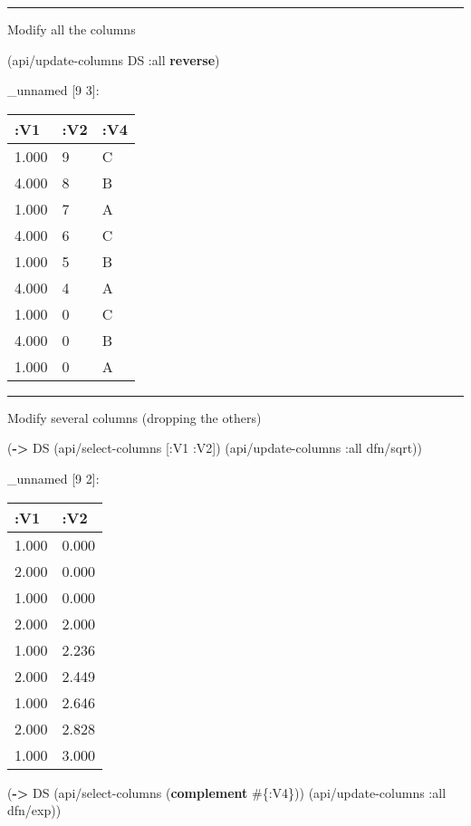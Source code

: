 \documentclass[]{article}
\newenvironment{Shaded}{\begin{snugshade}}{\end{snugshade}}
\newcommand{\KeywordTok}[1]{\textcolor[rgb]{0.13,0.29,0.53}{\textbf{#1}}}
\newcommand{\AttributeTok}[1]{\textcolor[rgb]{0.77,0.63,0.00}{#1}}
\newcommand{\NormalTok}[1]{#1}
\begin{document}
\begin{center}\rule{0.5\linewidth}{0.5pt}\end{center}

Modify all the columns

\begin{Shaded}
\begin{Highlighting}[]
\NormalTok{(api/update-columns DS }\AttributeTok{:all} \KeywordTok{reverse}\NormalTok{)}
\end{Highlighting}
\end{Shaded}

\_unnamed {[}9 3{]}:

\begin{longtable}[]{@{}lll@{}}
\toprule
:V1 & :V2 & :V4\tabularnewline
\midrule
\endhead
1.000 & 9 & C\tabularnewline
4.000 & 8 & B\tabularnewline
1.000 & 7 & A\tabularnewline
4.000 & 6 & C\tabularnewline
1.000 & 5 & B\tabularnewline
4.000 & 4 & A\tabularnewline
1.000 & 0 & C\tabularnewline
4.000 & 0 & B\tabularnewline
1.000 & 0 & A\tabularnewline
\bottomrule
\end{longtable}

\begin{center}\rule{0.5\linewidth}{0.5pt}\end{center}

Modify several columns (dropping the others)

\begin{Shaded}
\begin{Highlighting}[]
\NormalTok{(}\KeywordTok{->}\NormalTok{ DS}
\NormalTok{    (api/select-columns [}\AttributeTok{:V1} \AttributeTok{:V2}\NormalTok{])}
\NormalTok{    (api/update-columns }\AttributeTok{:all}\NormalTok{ dfn/sqrt))}
\end{Highlighting}
\end{Shaded}

\_unnamed {[}9 2{]}:

\begin{longtable}[]{@{}ll@{}}
\toprule
:V1 & :V2\tabularnewline
\midrule
\endhead
1.000 & 0.000\tabularnewline
2.000 & 0.000\tabularnewline
1.000 & 0.000\tabularnewline
2.000 & 2.000\tabularnewline
1.000 & 2.236\tabularnewline
2.000 & 2.449\tabularnewline
1.000 & 2.646\tabularnewline
2.000 & 2.828\tabularnewline
1.000 & 3.000\tabularnewline
\bottomrule
\end{longtable}

\begin{Shaded}
\begin{Highlighting}[]
\NormalTok{(}\KeywordTok{->}\NormalTok{ DS}
\NormalTok{    (api/select-columns (}\KeywordTok{complement}\NormalTok{ #\{}\AttributeTok{:V4}\NormalTok{\}))}
\NormalTok{    (api/update-columns }\AttributeTok{:all}\NormalTok{ dfn/exp))}
\end{Highlighting}
\end{Shaded}
\end{document}
